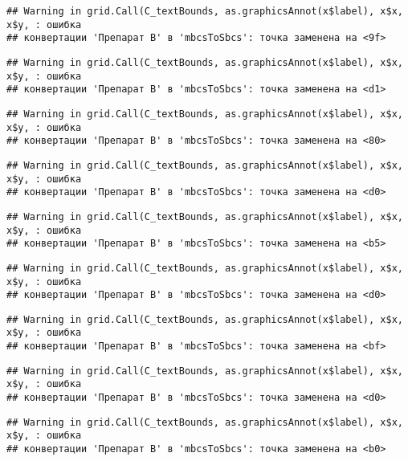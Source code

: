 \documentclass[
]{article}
\begin{document}
\begin{verbatim}
## Warning in grid.Call(C_textBounds, as.graphicsAnnot(x$label), x$x, x$y, : ошибка
## конвертации 'Препарат B' в 'mbcsToSbcs': точка заменена на <9f>
\end{verbatim}

\begin{verbatim}
## Warning in grid.Call(C_textBounds, as.graphicsAnnot(x$label), x$x, x$y, : ошибка
## конвертации 'Препарат B' в 'mbcsToSbcs': точка заменена на <d1>
\end{verbatim}

\begin{verbatim}
## Warning in grid.Call(C_textBounds, as.graphicsAnnot(x$label), x$x, x$y, : ошибка
## конвертации 'Препарат B' в 'mbcsToSbcs': точка заменена на <80>
\end{verbatim}

\begin{verbatim}
## Warning in grid.Call(C_textBounds, as.graphicsAnnot(x$label), x$x, x$y, : ошибка
## конвертации 'Препарат B' в 'mbcsToSbcs': точка заменена на <d0>
\end{verbatim}

\begin{verbatim}
## Warning in grid.Call(C_textBounds, as.graphicsAnnot(x$label), x$x, x$y, : ошибка
## конвертации 'Препарат B' в 'mbcsToSbcs': точка заменена на <b5>
\end{verbatim}

\begin{verbatim}
## Warning in grid.Call(C_textBounds, as.graphicsAnnot(x$label), x$x, x$y, : ошибка
## конвертации 'Препарат B' в 'mbcsToSbcs': точка заменена на <d0>
\end{verbatim}

\begin{verbatim}
## Warning in grid.Call(C_textBounds, as.graphicsAnnot(x$label), x$x, x$y, : ошибка
## конвертации 'Препарат B' в 'mbcsToSbcs': точка заменена на <bf>
\end{verbatim}

\begin{verbatim}
## Warning in grid.Call(C_textBounds, as.graphicsAnnot(x$label), x$x, x$y, : ошибка
## конвертации 'Препарат B' в 'mbcsToSbcs': точка заменена на <d0>
\end{verbatim}

\begin{verbatim}
## Warning in grid.Call(C_textBounds, as.graphicsAnnot(x$label), x$x, x$y, : ошибка
## конвертации 'Препарат B' в 'mbcsToSbcs': точка заменена на <b0>
\end{verbatim}
\end{document}
